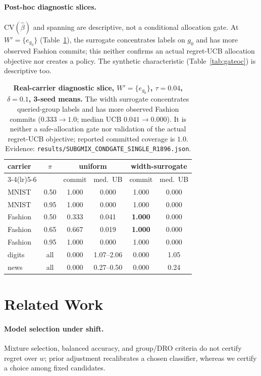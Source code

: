 \documentclass{article}
\begin{document}
\paragraph{Post-hoc diagnostic slices.} $\mathrm{CV}(\hat\beta)$ and spanning are descriptive,
not a conditional allocation gate. At $W'=\{e_{g_0}\}$ (Table~\ref{tab:m35gate}), the surrogate
concentrates labels on $g_0$ and has more observed Fashion commits; this neither confirms an
actual regret-UCB allocation objective nor creates a policy. The synthetic characteristic
(Table~\ref{tab:gateoc}) is descriptive too.
\begin{table}[t]
\centering\small\setlength{\tabcolsep}{4pt}
\begin{tabular}{lccccc}
\toprule
\multirow{2}{*}{carrier} & \multirow{2}{*}{$\pi$} &
  \multicolumn{2}{c}{uniform} & \multicolumn{2}{c}{width-surrogate} \\
\cmidrule(lr){3-4}\cmidrule(lr){5-6}
 & & commit & med.\ UB & commit & med.\ UB \\
\midrule
MNIST & 0.50 & 1.000 & 0.000 & 1.000 & 0.000 \\
MNIST & 0.95 & 1.000 & 0.000 & 1.000 & 0.000 \\
Fashion & 0.50 & 0.333 & 0.041 & \textbf{1.000} & 0.000 \\
Fashion & 0.65 & 0.667 & 0.019 & \textbf{1.000} & 0.000 \\
Fashion & 0.95 & 1.000 & 0.000 & 1.000 & 0.000 \\
digits & all & 0.000 & 1.07--2.06 & 0.000 & 1.05 \\
news & all & 0.000 & 0.27--0.50 & 0.000 & 0.24 \\
\bottomrule
\end{tabular}
\caption{\textbf{Real-carrier diagnostic slice, $W'=\{e_{g_0}\}$, $\tau{=}0.04$,
$\delta{=}0.1$, 3-seed means.} The width surrogate concentrates queried-group labels and has
more observed Fashion commits ($0.333\to1.0$; median UCB $0.041\to0.000$). It is neither a
safe-allocation gate nor validation of the actual regret-UCB objective; reported committed
coverage is $1.0$. Evidence:
\texttt{results/SUBGMIX\_CONDGATE\_SINGLE\_R1896.json}.}
\label{tab:m35gate}
\end{table}

\section{Related Work}
\label{sec:related}

\paragraph{Model selection under shift.} Mixture selection, balanced accuracy, and group/DRO
criteria \citep{sagawa2019distribution, duchi2019sparse} do not certify regret over $w$;
prior adjustment \citep{saerens2002adjusting} recalibrates a chosen classifier, whereas we
certify a choice among fixed candidates.
\end{document}
